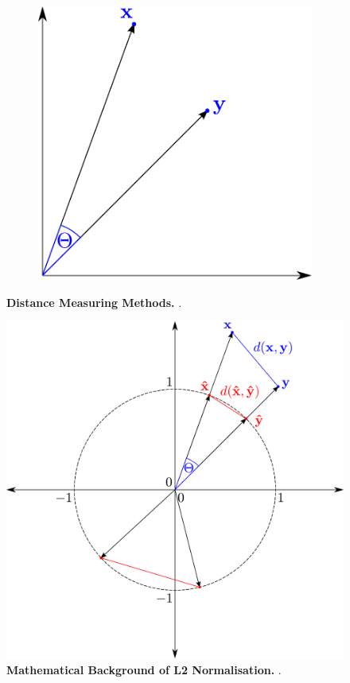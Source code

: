 \begin{figure}
\begin{subfigure}[b]{0.475\textwidth}
        \includegraphics[width=\textwidth]{Graphics/Cosinus.pdf}
    \end{subfigure}
    \caption[Distance Measuring Methods]{\textbf{Distance Measuring Methods.} .}
    \label{fig:Distance}
\end{figure}

\begin{figure}[!hbt]
    \centering
    \includegraphics[width=\textwidth]{Graphics/L2_Euclidean.pdf}
    \caption[Mathematical Background of L2 Normalisation]{\textbf{Mathematical Background of L2 Normalisation.} .}
    \label{fig:L2_Normalisation_Background}
\end{figure}

